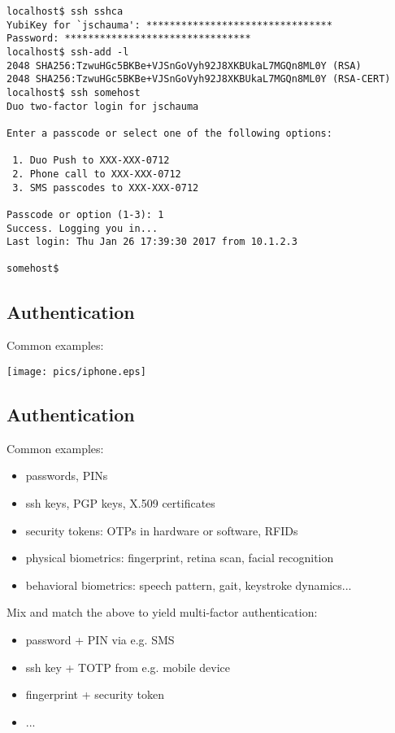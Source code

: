 \documentclass[xga]{xdvislides}
\newcommand{\smallish}{\fontsize{16}{16}\selectfont}
\begin{document}
\smallish
\begin{verbatim}
localhost$ ssh sshca
YubiKey for `jschauma': ********************************
Password: ********************************
localhost$ ssh-add -l
2048 SHA256:TzwuHGc5BKBe+VJSnGoVyh92J8XKBUkaL7MGQn8ML0Y (RSA)
2048 SHA256:TzwuHGc5BKBe+VJSnGoVyh92J8XKBUkaL7MGQn8ML0Y (RSA-CERT)
localhost$ ssh somehost
Duo two-factor login for jschauma

Enter a passcode or select one of the following options:

 1. Duo Push to XXX-XXX-0712
 2. Phone call to XXX-XXX-0712
 3. SMS passcodes to XXX-XXX-0712

Passcode or option (1-3): 1
Success. Logging you in...
Last login: Thu Jan 26 17:39:30 2017 from 10.1.2.3

somehost$ 
\end{verbatim}
\Normalsize

\subsection{Authentication}
Common examples:
\vfill
\begin{center}
	\texttt{[image: pics/iphone.eps]}
\end{center}
\vfill

\subsection{Authentication}
Common examples:
\begin{itemize}
	\item passwords, PINs
	\item ssh keys, PGP keys, X.509 certificates
	\item security tokens: OTPs in hardware or software, RFIDs
	\item physical biometrics: fingerprint, retina scan, facial recognition
	\item behavioral biometrics: speech pattern, gait, keystroke dynamics...
\end{itemize}
\vspace{.5in}

Mix and match the above to yield multi-factor
authentication:
\begin{itemize}
	\item password + PIN via e.g. SMS
	\item ssh key + TOTP from e.g. mobile device
	\item fingerprint + security token
	\item ...
\end{itemize}
\end{document}
